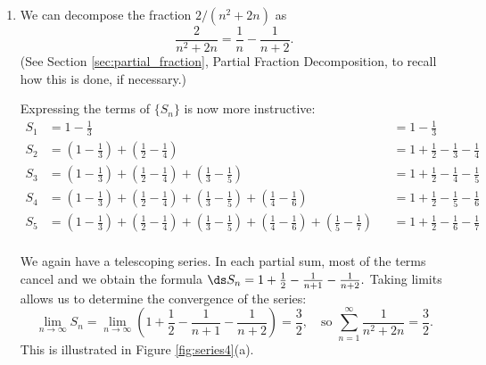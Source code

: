 {\begin{enumerate}
\item		We can decompose the fraction $2/(n^2+2n)$ as $$\frac2{n^2+2n} = \frac1n-\frac1{n+2}.$$ (See Section \ref{sec:partial_fraction}, Partial Fraction Decomposition, to recall how  this is done, if necessary.)

Expressing the terms of $\{S_n\}$ is now more instructive:
\small
\begin{align*}
S_1 &= 1-\frac13 &&= 1-\frac13\\
S_2 &= \left(1-\frac13\right) + \left(\frac12-\frac14\right) &&= 1+\frac12-\frac13-\frac14\\
S_3 &= \left(1-\frac13\right) + \left(\frac12-\frac14\right)+\left(\frac13-\frac15\right) &&= 1+\frac12-\frac14-\frac15\\
S_4 &= \left(1-\frac13\right) + \left(\frac12-\frac14\right)+\left(\frac13-\frac15\right)+\left(\frac14-\frac16\right) &&= 1+\frac12-\frac15-\frac16\\
S_5 &= \left(1-\frac13\right) + \left(\frac12-\frac14\right)+\left(\frac13-\frac15\right)+\left(\frac14-\frac16\right)+\left(\frac15-\frac17\right) &&= 1+\frac12-\frac16-\frac17\\
\end{align*}
\normalsize

We again have a telescoping series. In each partial sum, most of the terms cancel and we obtain the formula $\ds S_n = 1+\frac12-\frac1{n+1}-\frac1{n+2}.$ Taking limits allows us to determine the convergence of the series:
$$\lim_{n\to\infty}S_n = \lim_{n\to\infty} \left(1+\frac12-\frac1{n+1}-\frac1{n+2}\right) = \frac32,\quad \text{so } \sum_{n=1}^\infty \frac1{n^2+2n} = \frac32.$$
This is illustrated in Figure \ref{fig:series4}(a).


\end{enumerate}}
